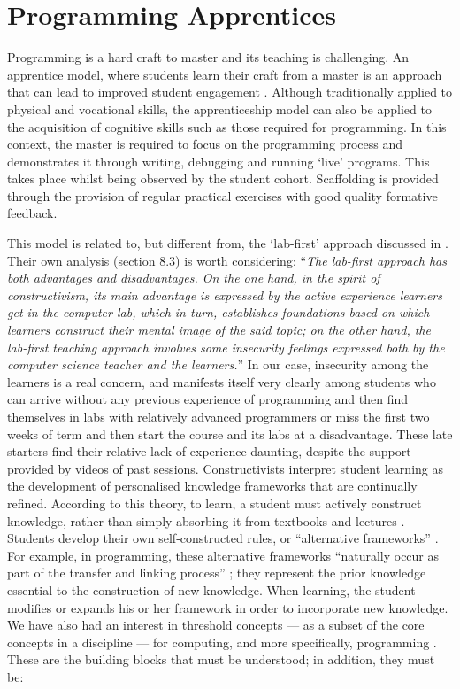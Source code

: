\documentclass[conference,compsoc]{IEEEtran}
\begin{document}
\section{Programming Apprentices}
Programming is a hard craft to master and its teaching is
challenging. An apprentice model, where students learn their craft
from a master is an approach that can lead to improved student
engagement \cite{Astrachan,Viha}. Although traditionally applied to
physical and vocational skills, the apprenticeship model can also be
applied to the acquisition of cognitive skills such as those required
for programming. In this context, the master is required to focus on
the programming process and demonstrates it through writing, debugging
and running `live' programs. This takes place whilst being observed by
the student cohort. Scaffolding is provided through the provision of
regular practical exercises with good quality formative feedback.

This model is related to, but different from, the `lab-first' approach
discussed in \cite{Hazzan}. Their own analysis (section 8.3) is worth
considering: ``{\emph{The lab-first approach has both advantages and
disadvantages. On the one hand, in the spirit of constructivism, its
main advantage is expressed by the active experience learners get in
the computer lab, which in turn, establishes foundations based on
which learners construct their mental image of the said topic; on the
other hand, the lab-first teaching approach involves some insecurity
feelings expressed both by the computer science teacher and the
learners.}}'' In our case, insecurity among the learners is a real
concern, and manifests itself very clearly among students who can
arrive without any previous experience of programming and then find
themselves in labs with relatively advanced programmers or miss the
first two weeks of term and then start the course and its labs at a
disadvantage. These late starters find their relative lack of
experience daunting, despite the support provided by videos of past
sessions.  Constructivists interpret student learning as the
development of personalised knowledge frameworks that are continually
refined. According to this theory, to learn, a student must actively
construct knowledge, rather than simply absorbing it from textbooks
and lectures \cite{Meyer}.  Students develop their own
self-constructed rules, or ``alternative frameworks''
\cite{BenAri}. For example, in programming, these alternative
frameworks ``naturally occur as part of the transfer and linking
process'' \cite{Clancy}; they represent the prior knowledge essential
to the construction of new knowledge. When learning, the student
modifies or expands his or her framework in order to incorporate new
knowledge. We have also had an interest in threshold concepts
\cite{Land,Meyer} --- as a subset of the core concepts in a discipline
--- for computing, and more specifically, programming
\cite{Khalife}. These are the building blocks that must be understood;
in addition, they must be:
\end{document}

